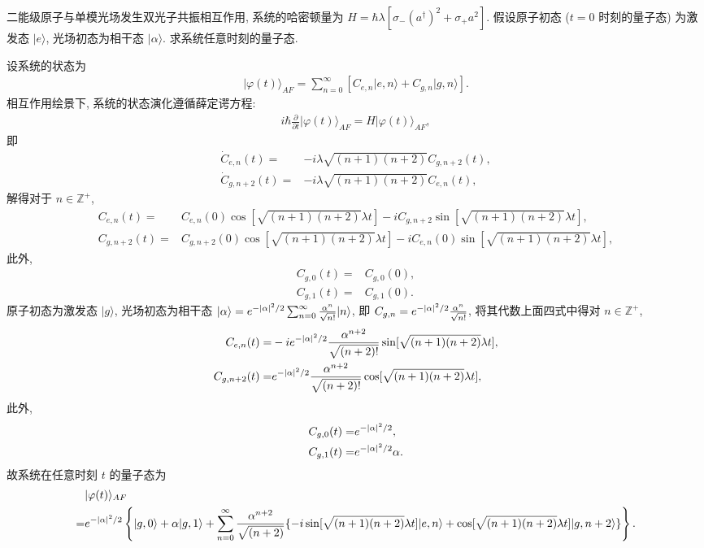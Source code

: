 \documentclass{assignment}
\begin{document}
\begin{prob}
    二能级原子与单模光场发生双光子共振相互作用, 系统的哈密顿量为 $H=\hbar\lambda[\sigma_-(a^{\dagger})^2+\sigma_+a^2]$. 假设原子初态 ($t=0$ 时刻的量子态) 为激发态 $\lvert e\rangle$, 光场初态为相干态 $\lvert\alpha\rangle$. 求系统任意时刻的量子态.
\end{prob}
\begin{sol}
    设系统的状态为
    \begin{align}
        \lvert\varphi(t)\rangle_{AF}=\sum_{n=0}^{\infty}[C_{e,n}\lvert e,n\rangle+C_{g,n}\lvert g,n\rangle].
    \end{align}
    相互作用绘景下, 系统的状态演化遵循薛定谔方程:
    \begin{align}
        i\hbar\frac{\partial}{\partial t}\lvert\varphi(t)\rangle_{AF}=H\lvert\varphi(t)\rangle_{AF},
    \end{align}
    即
    \begin{align}
        \dot{C}_{e,n}(t)=&-i\lambda\sqrt{(n+1)(n+2)}C_{g,n+2}(t),\\
        \dot{C}_{g,n+2}(t)=&-i\lambda\sqrt{(n+1)(n+2)}C_{e,n}(t),
    \end{align}
    解得对于 $n\in\mathbb{Z}^+$,
    \begin{align}
        C_{e,n}(t)=&C_{e,n}(0)\cos[\sqrt{(n+1)(n+2)}\lambda t]-iC_{g,n+2}\sin[\sqrt{(n+1)(n+2)}\lambda t],\\
        C_{g,n+2}(t)=&C_{g,n+2}(0)\cos[\sqrt{(n+1)(n+2)}\lambda t]-iC_{e,n}(0)\sin[\sqrt{(n+1)(n+2)}\lambda t],
    \end{align}
    此外,
    \begin{align}
        C_{g,0}(t)=&C_{g,0}(0),\\
        C_{g,1}(t)=&C_{g,1}(0).
    \end{align}
    原子初态为激发态 $\lvert g\rangle$, 光场初态为相干态 $\lvert\alpha\rangle=e^{-\left\lvert\alpha\right\rvert^2/2}\sum_{n=0}^{\infty}\frac{\alpha^n}{\sqrt{n!}}\lvert n\rangle$, 即 $C_{g,n}=e^{-\left\lvert\alpha\right\rvert^2/2}\frac{\alpha^n}{\sqrt{n!}}$, 将其代数上面四式中得对 $n\in\mathbb{Z}^+$,
    \begin{align}
        C_{e,n}(t)=&-ie^{-\left\lvert\alpha\right\rvert^2/2}\frac{\alpha^{n+2}}{\sqrt{(n+2)!}}\sin[\sqrt{(n+1)(n+2)}\lambda t],\\
        C_{g,n+2}(t)=&e^{-\left\lvert\alpha\right\rvert^2/2}\frac{\alpha^{n+2}}{\sqrt{(n+2)!}}\cos[\sqrt{(n+1)(n+2)}\lambda t],
    \end{align}
    此外,
    \begin{align}
        C_{g,0}(t)=&e^{-\left\lvert\alpha\right\rvert^2/2},\\
        C_{g,1}(t)=&e^{-\left\lvert\alpha\right\rvert^2/2}\alpha.
    \end{align}
    故系统在任意时刻 $t$ 的量子态为
    \begin{align}
        \notag&\lvert\varphi(t)\rangle_{AF}\\
        =&e^{-\left\lvert\alpha\right\rvert^2/2}\left\{\lvert g,0\rangle+\alpha\lvert g,1\rangle+\sum_{n=0}^{\infty}\frac{\alpha^{n+2}}{\sqrt{(n+2)}}\{-i\sin[\sqrt{(n+1)(n+2)}\lambda t]\lvert e,n\rangle+\cos[\sqrt{(n+1)(n+2)}\lambda t]\lvert g,n+2\rangle\}\right\}.
    \end{align}
\end{sol}
\end{document}
